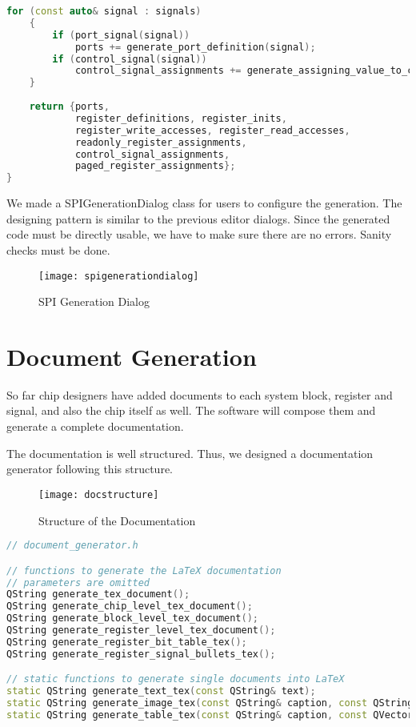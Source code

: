 \begin{lstlisting}[language=C++]
    for (const auto& signal : signals)
    {
        if (port_signal(signal)) 
            ports += generate_port_definition(signal);
        if (control_signal(signal)) 
            control_signal_assignments += generate_assigning_value_to_constrol_signal(signal);
    }
    
    return {ports,
            register_definitions, register_inits,
            register_write_accesses, register_read_accesses,
            readonly_register_assignments, 
            control_signal_assignments, 
            paged_register_assignments};
}
\end{lstlisting}

We made a SPIGenerationDialog class for users to configure the generation. The designing pattern is similar to the previous editor dialogs. Since the generated code must be directly usable, we have to make sure there are no errors. Sanity checks must be done.

\begin{figure}[htbp]
\centering
\texttt{[image: spigenerationdialog]}
\caption{SPI Generation Dialog\label{fig:SPI Generation Dialog}}
\end{figure} 

\section{Document Generation}
So far chip designers have added documents to each system block, register and signal, and also the chip itself as well. The software will compose them and generate a complete documentation.

The documentation is well structured. Thus, we designed a documentation generator following this structure.

\begin{figure}[htbp]
\centering
\texttt{[image: docstructure]}
\caption{Structure of the Documentation\label{fig:Structure of the Documentation}}
\end{figure} 

\begin{lstlisting}[language=C++]
// document_generator.h

// functions to generate the LaTeX documentation
// parameters are omitted
QString generate_tex_document();
QString generate_chip_level_tex_document();
QString generate_block_level_tex_document();
QString generate_register_level_tex_document();
QString generate_register_bit_table_tex();
QString generate_register_signal_bullets_tex();

// static functions to generate single documents into LaTeX
static QString generate_text_tex(const QString& text);
static QString generate_image_tex(const QString& caption, const QString& width, const QString& path);
static QString generate_table_tex(const QString& caption, const QVector<QVector<QString> >& cells);
\end{lstlisting}

